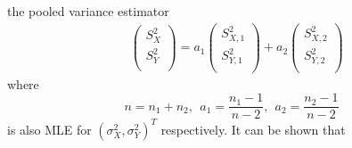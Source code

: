the pooled variance estimator 
\begin{equation}\label{eq:Slinearcomb}
\begin{aligned}
&\left( \begin{array}{c}
S_{X}^2\\
S_{Y}^2\\
\end{array}\right)
= 
a_1\left( \begin{array}{c}
S_{X, 1}^2\\
S_{Y,1}^2\\
\end{array}\right)
+
a_2\left( \begin{array}{c}
S_{X, 2}^2\\
S_{Y, 2}^2\\
\end{array}\right)
\end{aligned}
\end{equation}
where 
\[ 	n = n_1 + n_2, ~~a_1 = \frac{n_1 -1}{n-2}, ~~a_2 = \frac{n_2 -1}{n-2} \]
is also MLE for $(\sigma_X^2, \sigma_Y^2)^T$ respectively.
It can be shown that 
